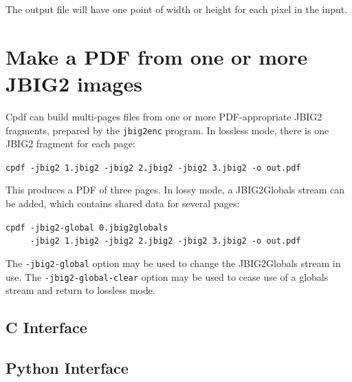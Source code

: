 \documentclass{book}
\begin{document}
\noindent The output file will have one point of width or height for each pixel in the input.

\section{Make a PDF from one or more JBIG2 images}

Cpdf can build multi-pages files from one or more PDF-appropriate JBIG2 fragments, prepared by the \texttt{jbig2enc} program. In lossless mode, there is one JBIG2 fragment for each page:

\begin{framed}
 \noindent\small\verb?cpdf -jbig2 1.jbig2 -jbig2 2.jbig2 -jbig2 3.jbig2 -o out.pdf?
\end{framed}

\noindent This produces a PDF of three pages. In lossy mode, a JBIG2Globals stream can be added, which contains shared data for several pages:

\begin{framed}
 \noindent\small\verb?cpdf -jbig2-global 0.jbig2globals?\\
 \noindent\small\verb!     -jbig2 1.jbig2 -jbig2 2.jbig2 -jbig2 3.jbig2 -o out.pdf!
\end{framed}

\noindent The \texttt{-jbig2-global} option may be used to change the JBIG2Globals stream in use. The \texttt{-jbig2-global-clear} option may be used to cease use of a globals stream and return to lossless mode.

\begin{cpdflib}
\clearpage
\section*{C Interface}
\begin{small}\tt

\end{small}
\end{cpdflib}

\begin{pycpdflib}
\clearpage
\section*{Python Interface}
\begin{small}\tt

\end{small}
\end{pycpdflib}
\end{document}
